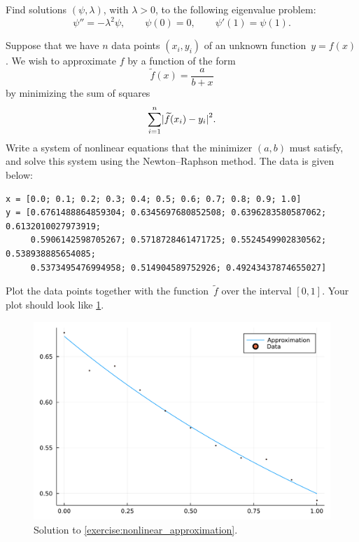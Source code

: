 \begin{exercise}
    Find solutions $(\psi, \lambda)$, with $\lambda > 0$,
    to the following eigenvalue problem:
    \[
        \psi'' = - \lambda^2 \psi, \qquad \psi(0) = 0, \qquad \psi'(1) = \psi(1).
    \]
\end{exercise}

\begin{exercise}
    \label{exercise:nonlinear_approximation}
    Suppose that we have $n$ data points $(x_i, y_i)$ of an unknown function~$y = f(x)$.
    We wish to approximate $f$ by a function of the form
    \[
        \widetilde f(x) = \frac{a}{b + x}
    \]
    by minimizing the sum of squares
    \[
        \sum_{i=1}^{n} \abs[big]{\widetilde f(x_i) - y_i}^2.
    \]
    Write a system of nonlinear equations that the minimizer $(a, b)$ must satisfy,
    and solve this system using the Newton--Raphson method.
    The data is given below:
    \begin{verbatim}
x = [0.0; 0.1; 0.2; 0.3; 0.4; 0.5; 0.6; 0.7; 0.8; 0.9; 1.0]
y = [0.6761488864859304; 0.6345697680852508; 0.6396283580587062; 0.6132010027973919;
     0.5906142598705267; 0.5718728461471725; 0.5524549902830562; 0.538938885654085;
     0.5373495476994958; 0.514904589752926; 0.49243437874655027]
    \end{verbatim}
    Plot the data points together with the function~$\widetilde f$ over the interval $[0, 1]$.
    Your plot should look like \cref{fig:solution_exercise_approximation}.
    \begin{figure}[ht]
        \centering
        \includegraphics[width=0.6\linewidth]{figures/approx.pdf}
        \caption{Solution to \cref{exercise:nonlinear_approximation}.}%
        \label{fig:solution_exercise_approximation}
    \end{figure}
\end{exercise}


